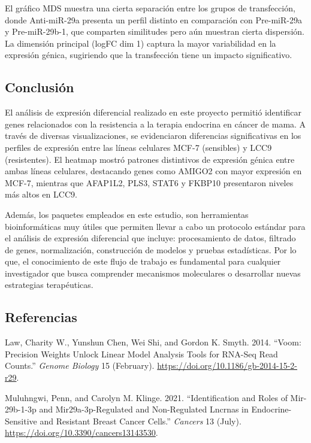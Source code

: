 \documentclass[
]{article}
\newlength{\cslhangindent}
\newenvironment{CSLReferences}[2] %
 {\begin{list}{}{%
  \setlength{\itemindent}{0pt}
  \setlength{\leftmargin}{0pt}
  \setlength{\parsep}{0pt}
  \ifodd #1
   \setlength{\leftmargin}{\cslhangindent}
   \setlength{\itemindent}{-1\cslhangindent}
  \fi
  \setlength{\itemsep}{#2\baselineskip}}}
 {\end{list}}
\begin{document}
El gráfico MDS muestra una cierta separación entre los grupos de
transfección, donde Anti-miR-29a presenta un perfil distinto en
comparación con Pre-miR-29a y Pre-miR-29b-1, que comparten similitudes
pero aún muestran cierta dispersión. La dimensión principal (logFC dim
1) captura la mayor variabilidad en la expresión génica, sugiriendo que
la transfección tiene un impacto significativo.

\subsection{Conclusión}\label{conclusiuxf3n}

El análisis de expresión diferencial realizado en este proyecto permitió
identificar genes relacionados con la resistencia a la terapia endocrina
en cáncer de mama. A través de diversas visualizaciones, se evidenciaron
diferencias significativas en los perfiles de expresión entre las líneas
celulares MCF-7 (sensibles) y LCC9 (resistentes). El heatmap mostró
patrones distintivos de expresión génica entre ambas líneas celulares,
destacando genes como AMIGO2 con mayor expresión en MCF-7, mientras que
AFAP1L2, PLS3, STAT6 y FKBP10 presentaron niveles más altos en LCC9.

Además, los paquetes empleados en este estudio, son herramientas
bioinformáticas muy útiles que permiten llevar a cabo un protocolo
estándar para el análisis de expresión diferencial que incluye:
procesamiento de datos, filtrado de genes, normalización, construcción
de modelos y pruebas estadísticas. Por lo que, el conocimiento de este
flujo de trabajo es fundamental para cualquier investigador que busca
comprender mecanismos moleculares o desarrollar nuevas estrategias
terapéuticas.

\subsection*{Referencias}\label{referencias}

\label{refs}
\begin{CSLReferences}{1}{0}
Law, Charity W., Yunshun Chen, Wei Shi, and Gordon K. Smyth. 2014.
{``Voom: Precision Weights Unlock Linear Model Analysis Tools for
RNA-Seq Read Counts.''} \emph{Genome Biology} 15 (February).
\url{https://doi.org/10.1186/gb-2014-15-2-r29}.

Muluhngwi, Penn, and Carolyn M. Klinge. 2021. {``Identification and
Roles of Mir-29b-1-3p and Mir29a-3p-Regulated and Non-Regulated Lncrnas
in Endocrine-Sensitive and Resistant Breast Cancer Cells.''}
\emph{Cancers} 13 (July). \url{https://doi.org/10.3390/cancers13143530}.

\end{CSLReferences}
\end{document}
